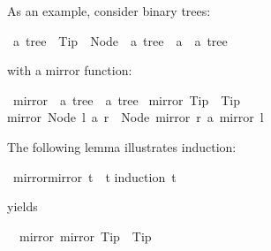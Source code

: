 \begin{isabellebody}
\begin{isamarkuptext}
As an example, consider binary trees:%
\end{isamarkuptext}%
\isamarkuptrue%
\isamarkupfalse%
\ {}a\ tree\ {}\ Tip\ {}\ Node\ \ {}{}a\ tree{}\ \ {}a\ \ {}{}a\ tree{}%
\begin{isamarkuptext}%
with a mirror function:%
\end{isamarkuptext}%
\isamarkuptrue%
\isamarkupfalse%
\ mirror\ {}{}\ {}{}a\ tree\ {}\ {}a\ tree{}\ \isanewline
{}mirror\ Tip\ {}\ Tip{}\ {}\isanewline
{}mirror\ {}Node\ l\ a\ r{}\ {}\ Node\ {}mirror\ r{}\ a\ {}mirror\ l{}{}%
\begin{isamarkuptext}%
The following lemma illustrates induction:%
\end{isamarkuptext}%
\isamarkuptrue%
\isamarkupfalse%
\ {}mirror{}mirror\ t{}\ {}\ t{}\isanewline
%
\isadelimproof
%
\endisadelimproof
%
\isatagproof
{}\isamarkupfalse%
{}induction\ t{}%
\begin{isamarkuptxt}%
yields
\begin{isabelle}%
\ {}{}\ mirror\ {}mirror\ Tip{}\ {}\ Tip\isanewline

\end{isabelle}
\end{isamarkuptxt}
\end{isabellebody}
